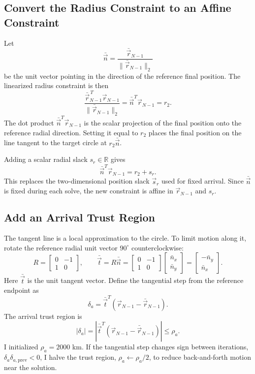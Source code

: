 \documentclass{article}
\begin{document}
\subsection{Convert the Radius Constraint to an Affine Constraint}

Let
\[
\bar{\vec{n}}=\frac{\bar{\vec{r}}_{N-1}}{\|\bar{\vec{r}}_{N-1}\|_2}
\]
be the unit vector pointing in the direction of the reference final position. The linearized radius constraint is then
\[
\frac{\bar{\vec{r}}_{N-1}^{\,T}\vec{r}_{N-1}}{\|\bar{\vec{r}}_{N-1}\|_2}
=\bar{\vec{n}}^T\vec{r}_{N-1}=r_2.
\]
The dot product $\bar{\vec{n}}^T\vec{r}_{N-1}$ is the scalar projection of the final position onto the reference radial direction. Setting it equal to $r_2$ places the final position on the line tangent to the target circle at $r_2\bar{\vec{n}}$.

Adding a scalar radial slack $s_r\in\mathbb R$ gives
\[
\boxed{\bar{\vec{n}}^T\vec{r}_{N-1}=r_2+s_r.}
\]
This replaces the two-dimensional position slack $\vec{s}_r$ used for fixed arrival. Since $\bar{\vec{n}}$ is fixed during each solve, the new constraint is affine in $\vec{r}_{N-1}$ and $s_r$.

\subsection{Add an Arrival Trust Region}

The tangent line is a local approximation to the circle. To limit motion along it, rotate the reference radial unit vector $90^\circ$ counterclockwise:
\[
R=\begin{bmatrix}0&-1\\1&0\end{bmatrix},
\qquad
\bar{\vec{t}}=R\bar{\vec{n}}
=\begin{bmatrix}0&-1\\1&0\end{bmatrix}
\begin{bmatrix}\bar n_x\\\bar n_y\end{bmatrix}
=\begin{bmatrix}-\bar n_y\\\bar n_x\end{bmatrix}.
\]
Here $\bar{\vec{t}}$ is the unit tangent vector. Define the tangential step from the reference endpoint as
\[
\delta_a=\bar{\vec{t}}^T
\left(\vec{r}_{N-1}-\bar{\vec{r}}_{N-1}\right).
\]
The arrival trust region is
\[
\boxed{|\delta_a|
=\left|\bar{\vec{t}}^T
\left(\vec{r}_{N-1}-\bar{\vec{r}}_{N-1}\right)\right|
\le\rho_a.}
\]
I initialized $\rho_a=2000$ km. If the tangential step changes sign between iterations, $\delta_a\delta_{a,\mathrm{prev}}<0$, I halve the trust region, $\rho_a\leftarrow\rho_a/2$, to reduce back-and-forth motion near the solution.
\end{document}
